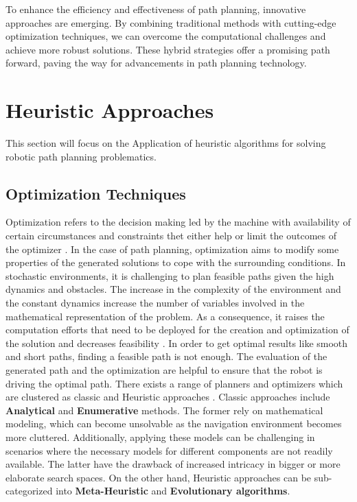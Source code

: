 To enhance the efficiency and effectiveness of path planning, innovative approaches are emerging. 
By combining traditional methods with cutting-edge optimization techniques, we can overcome the 
computational challenges and achieve more robust solutions. These hybrid strategies offer a 
promising path forward, paving the way for advancements in path planning technology.



\section{Heuristic Approaches}
This section will focus on the Application of heuristic algorithms for solving robotic path planning 
problematics. 

\subsection{Optimization Techniques}
Optimization refers to the decision making led by the machine with availability of certain circumstances and constraints
thet either help or limit the outcomes of the optimizer \cite{R37}. In the case of path planning, optimization aims
to modify some properties of the generated solutions to cope with the surrounding conditions.
In stochastic environments, it is challenging to plan feasible paths given the high dynamics 
and obstacles.
The increase in the complexity of the environment and the constant dynamics increase the number of variables involved 
in the mathematical representation of the problem. As a consequence, it raises the computation efforts that need to be 
deployed for the creation and optimization of the solution and decreases feasibility \cite{R7}.
In order to get optimal results like smooth and short paths, finding a feasible path is not enough. The evaluation 
of the generated path and the optimization are helpful to ensure that the robot is driving the optimal path.
There exists a range of planners and optimizers which are clustered as classic and Heuristic approaches \cite{R12}.
Classic approaches include \textbf{Analytical} and \textbf{Enumerative} methods. 
The former rely on mathematical modeling, which can become unsolvable as the navigation environment becomes more 
cluttered. Additionally, applying these models can be challenging in scenarios where the necessary models for different 
components are not readily available. The latter have the drawback of increased intricacy in bigger or more elaborate 
search spaces. On the other hand, Heuristic approaches can be sub-categorized into \textbf{Meta-Heuristic} and \textbf{Evolutionary algorithms}.
